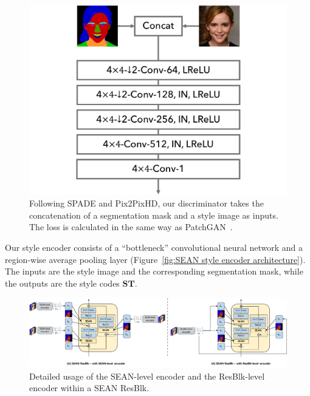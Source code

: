 \documentclass[10pt,twocolumn,letterpaper]{article}
\begin{document}
\begin{figure}[ht]
\centering
\includegraphics[width=0.9\linewidth]{Supp/architecture/supp_discriminator.pdf}
\caption{Following SPADE and Pix2PixHD, our discriminator takes the concatenation of a segmentation mask and a style image as inputs. The loss is calculated in the same way  as PatchGAN~\cite{isola2016imagetoimage}.}
\label{fig:SEAN discriminator architecture}
\end{figure}

 Our style encoder consists of a ``bottleneck'' convolutional neural network and a region-wise average pooling layer (Figure~\ref{fig:SEAN style encoder architecture}). The inputs are the style image and the corresponding segmentation mask, while the outputs are the style codes $\mathbf{ST}$.

\begin{figure}[th]
\centering
\includegraphics[width=\linewidth]{Supp/Different_encoders.pdf}
\caption{Detailed usage of the SEAN-level encoder and the ResBlk-level encoder within a SEAN ResBlk.}
\label{fig:different encoders}
\end{figure}
\end{document}
